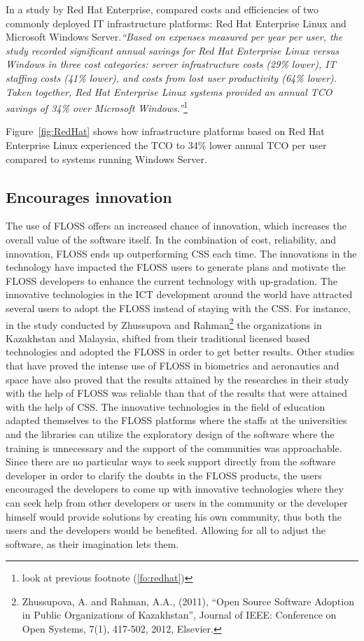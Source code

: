 In a study by Red Hat Enterprise, compared costs and efficiencies of two commonly deployed IT infrastructure platforms: Red Hat Enterprise Linux and Microsoft Windows Server.\textit{``Based on expenses measured per year per user, the study recorded significant annual savings for Red Hat Enterprise Linux versus Windows in three cost categories: server infrastructure costs (29\% lower), IT staffing costs (41\% lower), and costs from lost user productivity (64\% lower). Taken together, Red Hat Enterprise Linux systems provided an annual TCO savings of 34\% over Microsoft Windows.''}\footnote{look at previous footnote  (\ref{fo:redhat})}

 
Figure~\ref{fig:RedHat} shows how infrastructure platforms based on Red Hat Enterprise Linux experienced the TCO  to 34\% lower annual TCO per user compared to systems running Windows Server.

 \subsection{Encourages innovation}
  The use of FLOSS offers an increased chance of innovation, which increases the overall value of the software itself. In the combination of cost, reliability, and innovation, FLOSS ends up outperforming CSS  each time.
  The innovations in the technology have impacted the FLOSS users to generate plans and motivate the FLOSS developers to enhance the current technology with up-gradation. The innovative technologies in the ICT development around the world have attracted several users to adopt the FLOSS instead of staying with the CSS. For instance, in the study conducted by Zhussupova and Rahman\footnote{Zhussupova, A. and Rahman, A.A., (2011), ``Open Source Software Adoption in Public Organizations of Kazakhstan'', Journal of IEEE: Conference on Open Systems, 7(1), 417-502, 2012, Elsevier.} the organizations in Kazakhstan and Malaysia, shifted from their traditional licensed based technologies and adopted the FLOSS in order to get better results. Other studies that have proved the intense use of FLOSS in biometrics and aeronautics and space have also proved that the results attained by the researches in their study with the help of FLOSS was reliable than that of the results that were attained with the help of CSS. The innovative technologies in the field of education adapted themselves to the FLOSS platforms where the staffs at the universities and the libraries can utilize the exploratory design of the software where the training is unnecessary and the support of the communities was approachable. Since there are no particular ways to seek support directly from the software developer in order to clarify the doubts in the FLOSS products, the users encouraged the developers to come up with innovative technologies where they can seek help from other developers or users in the community or the developer himself would provide solutions by creating his own community, thus both the users and the developers would be benefited. Allowing for all to adjust the software, as their imagination lets them.  
  
